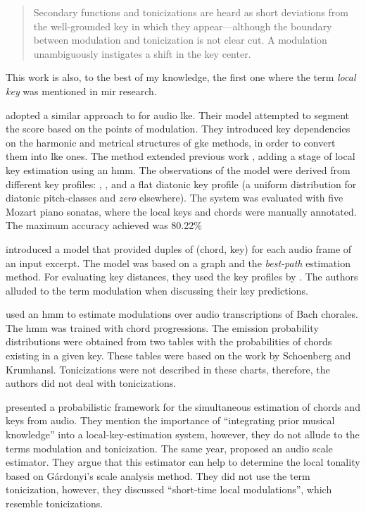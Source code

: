 \begin{quote}
    Secondary functions and tonicizations are heard as short
    deviations from the well-grounded key in which they
    appear---although the boundary between modulation and
    tonicization is not clear cut. A modulation
    unambiguously instigates a shift in the key center.
\end{quote}

This work is also, to the best of my knowledge, the first
one where the term \emph{local key} was mentioned in
\gls{mir} research.

\textcite{papadopoulos2009local} adopted a similar approach
to \textcite{izmirli2007localized} for audio \gls{lke}.
Their model attempted to segment the score based on the
points of modulation. They introduced key dependencies on
the harmonic and metrical structures of \gls{gke} methods,
in order to convert them into \gls{lke} ones. The method
extended previous work
\parencite{papadopoulos2008simultaneous}, adding a stage of
local key estimation using an \gls{hmm}. The observations of
the model were derived from different key profiles:
\textcite{krumhansl1982tracing},
\textcite{temperley1999whats}, and a flat diatonic key
profile (a uniform distribution for diatonic pitch-classes
and \emph{zero} elsewhere). The system was evaluated with
five Mozart piano sonatas, where the local keys and chords
were manually annotated. The maximum accuracy achieved was
80.22\%

\textcite{rocher2010concurrent} introduced a model that
provided duples of (chord, key) for each audio frame of an
input excerpt. The model was based on a graph and the
\emph{best-path} estimation method. For evaluating key
distances, they used the key profiles by
\textcite{temperley1999whats}. The authors alluded to the
term modulation when discussing their key predictions.

\textcite{mearns2011automatically} used an \gls{hmm} to
estimate modulations over audio transcriptions of Bach
chorales. The \gls{hmm} was trained with chord progressions.
The emission probability distributions were obtained from
two tables with the probabilities of chords existing in a
given key. These tables were based on the work by Schoenberg
and Krumhansl. Tonicizations were not described in these
charts, therefore, the authors did not deal with
tonicizations.


\textcite{pauwels2014combining} presented a probabilistic
framework for the simultaneous estimation of chords and keys
from audio. They mention the importance of ``integrating
prior musical knowledge'' into a local-key-estimation
system, however, they do not allude to the terms modulation
and tonicization. The same year,
\textcite{weis2014chromabased} proposed an audio scale
estimator. They argue that this estimator can help to
determine the local tonality based on G\'{a}rdonyi's scale
analysis method. They did not use the term tonicization,
however, they discussed ``short-time local modulations'',
which resemble tonicizations.

